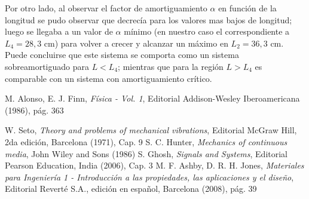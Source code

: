 \documentclass[twoside,twocolumn,a4paper]{article}
\begin{document}
Por otro lado, al observar el factor de amortiguamiento $\alpha$ en funci\'on de la longitud se pudo observar que decrec\'ia para los valores mas bajos de longitud; luego se llegaba a un valor de $\alpha$ m\'inimo (en nuestro caso el correspondiente a $L_{4} = 28,3$ cm) para volver a crecer y alcanzar un m\'aximo en $L_{2} = 36,3$ cm. Puede concluirse que este sistema se comporta como un sistema sobreamortiguado para $L < L_{4}$; mientras que para la regi\'on $L > L_{4}$ es comparable con un sistema con amortiguamiento cr\'itico. 


\begin{thebibliography}{99} %


 M. Alonso, E. J. Finn, \textit{F\'isica - Vol. 1}, Editorial Addison-Wesley Iberoamericana (1986), p\'ag. 363

 W. Seto, \textit{Theory and problems of mechanical vibrations}, Editorial McGraw Hill, 2da edici\'on, Barcelona (1971), Cap. 9
 S. C. Hunter, \textit{Mechanics of continuous media}, John Wiley and Sons (1986)
 S. Ghosh, \textit{Signals and Systems}, Editorial Pearson Education, India (2006), Cap. 3
 M. F. Ashby, D. R. H. Jones, \textit{Materiales para Ingenier\'ia 1 - Introducci\'on a las propiedades, las aplicaciones y el dise\~no}, Editorial Revert\'e S.A., edici\'on en espa\~nol, Barcelona (2008), p\'ag. 39

 
\end{thebibliography}


\end{document}
